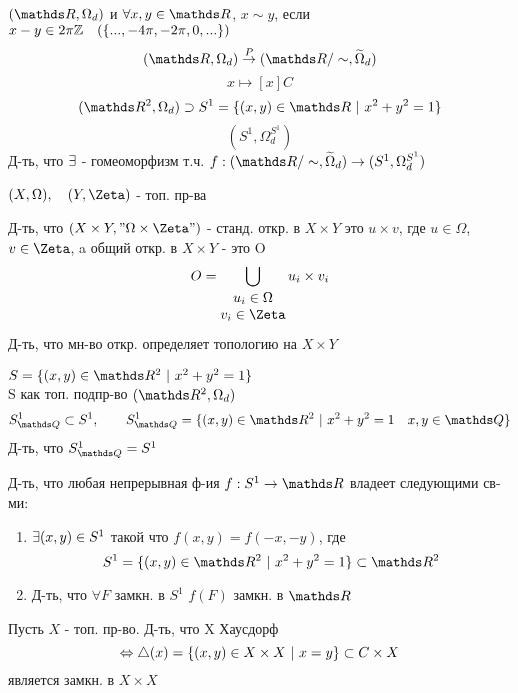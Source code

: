 \documentclass[geometry.tex]{subfiles}
\begin{document}
  \begin{task}
      $(\R, \Omega_d)$ и $\forall x,y \in \R$, $x \sim y$, если $x - y \in 2\pi\mathbb{Z} \quad (\{...,-4\pi,-2\pi,0,...\})$
      \[(\R, \Omega_d) \os{P}{\ra} (\R/\sim, \w{\Omega}_d)\]
      \[x \mapsto [x]C\]
      \[(\R^2, \Omega_d) \supset S^1 = \{(x,y) \in \R \ |\ x^2 + y^2 = 1\}\]
      \[(S^1, \Omega_d^{S^1})\]
      Д-ть, что $\exists$ - гомеоморфизм т.ч. $f: (\R/\sim, \w{\Omega}_d) \ra (S^1, \Omega_d^{S^1})$
  \end{task}

  \begin{task}
      $(X, \Omega),\q (Y, \Zeta)$ - топ. пр-ва

      Д-ть, что $(X \times Y, "\Omega \times \Zeta"{})$ - станд. откр. в $X \times Y$ это $u \times v$, где $u \in \Omega$, $v \in \Zeta$, a общий откр. в $X \times Y$ - это O
      \[O = \bigcup_{\begin{matrix}
        u_i \in \Omega\\
        v_i \in \Zeta
      \end{matrix}} u_i \times v_i\]
      Д-ть, что мн-во откр. определяет топологию на $X \times Y$
  \end{task}

  \begin{task}
      $S = \{(x,y) \in \R^2 \ |\ x^2 + y^2 = 1\}$\\
      S как топ. подпр-во $(\R^2, \Omega_d)$
      \[S^1_{\Q} \subset S^1,\qq S_{\Q}^1 = \{(x,y) \in \R^2 \ |\ x^2 + y^2 = 1\q x,y \in \Q\}\]
      Д-ть, что $S_{\Q}^1 = S^{1}$
  \end{task}

  \begin{task}
      Д-ть, что любая непрерывная ф-ия $f: S^1 \ra \R$ владеет следующими св-ми:
      \begin{enumerate}
        \item $\exists (x,y) \in S^1$ такой что $f(x, y) = f(-x, -y)$, где
        \[S^1 = \{(x, y) \in \R^2 \ |\ x^2 + y^2 = 1\} \subset \R^2\]
        \item Д-ть, что $\forall F$ замкн. в $S^1$ $f(F)$ замкн. в $\R$
      \end{enumerate}
  \end{task}

  \begin{task}
      Пусть $X$ - топ. пр-во. Д-ть, что X Хаусдорф
      \[\Leftrightarrow \triangle(x) = \{(x,y) \in X \times X \ |\ x = y\} \subset C \times X\]
      является замкн. в $X \times X$
  \end{task}
\end{document}
